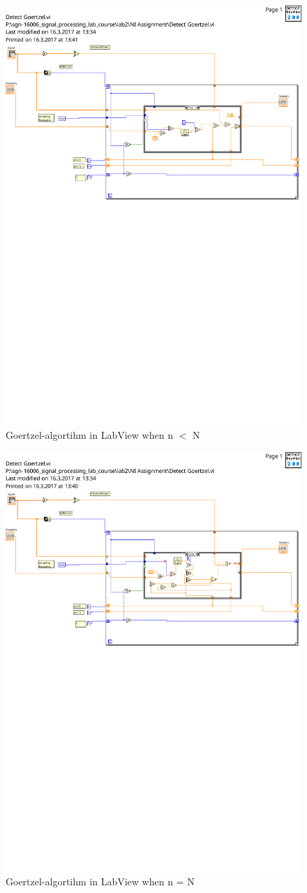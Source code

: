\begin{figure}[H]
  \centering
  \includegraphics[width=0.8\linewidth]{detect_goertzel_true}
  \caption{Goertzel-algortihm in LabView when n $<$ N}
\label{fig:GoertzelTrue}
\end{figure}


\begin{figure}[H]
  \centering
  \includegraphics[width=0.8\linewidth]{detect_goertzel_false}
  \caption{Goertzel-algortihm in LabView when n = N}
\label{fig:GoertzelFalse}
\end{figure}

